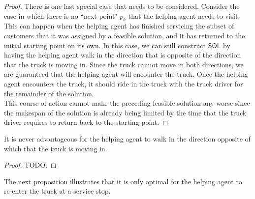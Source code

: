 \documentclass[12pt]{scrartcl}
\begin{document}
\begin{proof}
\noindent There is one last special case that needs to be considered. Consider the case in which there is no ``next point" $p_k$ that the helping agent needs to visit. This can happen when the helping agent has finished servicing the subset of customers that it was assigned by a feasible solution, and it has returned to the initial starting point on its own. In this case, we can still construct $\mathsf{SOL}$ by having the helping agent walk in the direction that is opposite of the direction that the truck is moving in. Since the truck cannot move in both directions, we are guaranteed that the helping agent will encounter the truck. Once the helping agent encounters the truck, it should ride in the truck with the truck driver for the remainder of the solution. \\

This course of action cannot make the preceding feasible solution any worse since the makespan of the solution is already being limited by the time that the truck driver requires to return back to the starting point. 
\end{proof}


\begin{proposition}
It is never advantageous for the helping agent to walk in the direction opposite of which that the truck is moving in. 
\end{proposition}
\begin{proof}
TODO. 
\end{proof}

The next proposition illustrates that it is only optimal for the helping agent to re-enter the truck at a service stop. 
\end{document}
